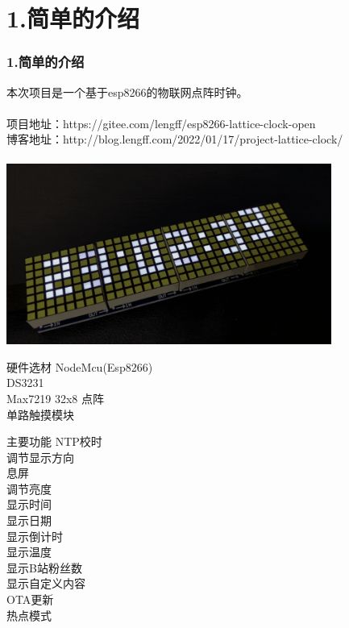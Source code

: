 \documentclass[16pt]{beamer}	%
\newcommand{\ftitle}[1]{\frametitle{#1}}	%
\begin{document}
		\section{1.简单的介绍}
		\begin{frame}
			\ftitle{1.简单的介绍}
			本次项目是一个基于esp8266的物联网点阵时钟。\\ \hspace*{\fill}
		\small	\\项目地址：https://gitee.com/lengff/esp8266-lattice-clock-open
			\\博客地址：http://blog.lengff.com/2022/01/17/project-lattice-clock/
		\\ \hspace*{\fill} \\	\includegraphics[width=0.8\textwidth]{pic/1-1.png}
		\end{frame}
		\begin{frame}
			\begin{block}{硬件选材}
			\small NodeMcu(Esp8266)\\DS3231\\Max7219 32x8 点阵\\单路触摸模块
			\end{block}
			\begin{block}{主要功能}
			\small	NTP校时
				\\调节显示方向
				\\息屏
				\\调节亮度
				\\显示时间
				\\显示日期
				\\显示倒计时
				\\显示温度
				\\显示B站粉丝数
				\\显示自定义内容
				\\OTA更新
				\\热点模式
			\end{block}
		\end{frame}
		
\end{document}
